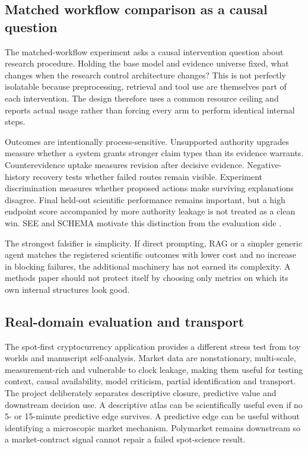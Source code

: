 \subsection{Matched workflow comparison as a causal question}

The matched-workflow experiment asks a causal intervention question about research procedure. Holding the base model and evidence universe fixed, what changes when the research control architecture changes? This is not perfectly isolatable because preprocessing, retrieval and tool use are themselves part of each intervention. The design therefore uses a common resource ceiling and reports actual usage rather than forcing every arm to perform identical internal steps.

Outcomes are intentionally process-sensitive. Unsupported authority upgrades measure whether a system grants stronger claim types than its evidence warrants. Counterevidence uptake measures revision after decisive evidence. Negative-history recovery tests whether failed routes remain visible. Experiment discrimination measures whether proposed actions make surviving explanations disagree. Final held-out scientific performance remains important, but a high endpoint score accompanied by more authority leakage is not treated as a clean win. SEE and SCHEMA motivate this distinction from the evaluation side \cite{han2026see,feng2026schema}.

The strongest falsifier is simplicity. If direct prompting, RAG or a simpler generic agent matches the registered scientific outcomes with lower cost and no increase in blocking failures, the additional \RAKL{} machinery has not earned its complexity. A methods paper should not protect itself by choosing only metrics on which its own internal structures look good.

\subsection{Real-domain evaluation and transport}

The spot-first cryptocurrency application provides a different stress test from toy worlds and manuscript self-analysis. Market data are nonstationary, multi-scale, measurement-rich and vulnerable to clock leakage, making them useful for testing context, causal availability, model criticism, partial identification and transport. The project deliberately separates descriptive closure, predictive value and downstream decision use. A descriptive atlas can be scientifically useful even if no 5- or 15-minute predictive edge survives. A predictive edge can be useful without identifying a microscopic market mechanism. Polymarket remains downstream so a market-contract signal cannot repair a failed spot-science result.


